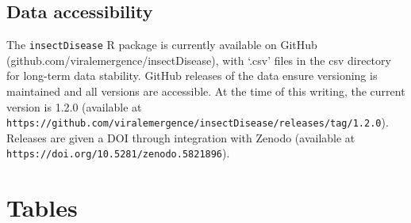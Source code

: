 \documentclass[12pt]{article}
\begin{document}
\subsection*{Data accessibility}
The \texttt{insectDisease} R package is currently available on GitHub \\ (github.com/viralemergence/insectDisease), with `.csv' files in the csv directory for long-term data stability. GitHub releases of the data ensure versioning is maintained and all versions are accessible. At the time of this writing, the current version is 1.2.0 (available at \\ \texttt{https://github.com/viralemergence/insectDisease/releases/tag/1.2.0}). \\
Releases are given a DOI through integration with Zenodo (available at \\ \texttt{https://doi.org/10.5281/zenodo.5821896}). 
 















\clearpage


\clearpage


























\clearpage


\section*{Tables}
\end{document}
